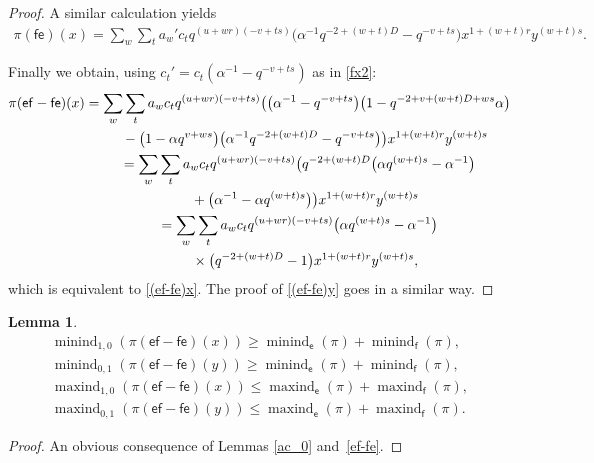 \documentclass[10pt,a4paper]{amsart}
\numberwithin{equation}{section}
\newtheorem{Lemma}[Theorem]{Lemma}
\begin{document}
\begin{proof}
A similar calculation yields
\begin{gather*}
\pi(\mathsf{fe})(x)=\sum_w\sum_ta_w'c_tq^{(u+wr)(-v+ts)} \big(\alpha^{-1}q^{-2+(w+t)D}-q^{-v+ts}\big)x^{1+(w+t)r}y^{(w+t)s}.
\end{gather*}

Finally we obtain, using $c_t'=c_t(\alpha^{-1}-q^{-v+ts})$ as in \eqref{fx2}:
\begin{gather*}
\pi(\mathsf{ef-fe})(x)=\sum_w\sum_ta_wc_tq^{(u+wr)(-v+ts)} \big(\big(\alpha^{-1}-q^{-v+ts}\big)\big(1-q^{-2+v+(w+t)D+ws}\alpha\big)\\
\hphantom{\pi(\mathsf{ef-fe})(x)=}{} -\big(1-\alpha q^{v+ws}\big)\big(\alpha^{-1}q^{-2+(w+t)D}-q^{-v+ts}\big)\big)x^{1+(w+t)r}y^{(w+t)s}\\
\hphantom{\pi(\mathsf{ef-fe})(x)}{}=\sum_w\sum_ta_wc_tq^{(u+wr)(-v+ts)} \big(q^{-2+(w+t)D}\big(\alpha q^{(w+t)s}-\alpha^{-1}\big)\\
\hphantom{\pi(\mathsf{ef-fe})(x)=}{} +\big(\alpha^{-1}-\alpha q^{(w+t)s}\big)\big)x^{1+(w+t)r}y^{(w+t)s}\\
\hphantom{\pi(\mathsf{ef-fe})(x)}{} =\sum_w\sum_ta_wc_tq^{(u+wr)(-v+ts)}\big(\alpha q^{(w+t)s}-\alpha^{-1}\big)\\
\hphantom{\pi(\mathsf{ef-fe})(x)=}{} \times \big(q^{-2+(w+t)D}-1\big)x^{1+(w+t)r}y^{(w+t)s},
\end{gather*}
which is equivalent to \eqref{(ef-fe)x}. The proof of \eqref{(ef-fe)y} goes in a similar way.
\end{proof}

\begin{Lemma}\label{extr_(ef-fe)}
\begin{gather*}
\operatorname{minind}_{1,0}(\pi(\mathsf{ef}-\mathsf{fe})(x)) \ge\operatorname{minind}_\mathsf{e}(\pi)+\operatorname{minind}_\mathsf{f}(\pi),\\
\operatorname{minind}_{0,1}(\pi(\mathsf{ef}-\mathsf{fe})(y)) \ge\operatorname{minind}_\mathsf{e}(\pi)+\operatorname{minind}_\mathsf{f}(\pi),\\
\operatorname{maxind}_{1,0}(\pi(\mathsf{ef}-\mathsf{fe})(x)) \le\operatorname{maxind}_\mathsf{e}(\pi)+\operatorname{maxind}_\mathsf{f}(\pi),\\
\operatorname{maxind}_{0,1}(\pi(\mathsf{ef}-\mathsf{fe})(y)) \le\operatorname{maxind}_\mathsf{e}(\pi)+\operatorname{maxind}_\mathsf{f}(\pi).
\end{gather*}
\end{Lemma}

\begin{proof} An obvious consequence of Lemmas \ref{ac_0} and~\ref{ef-fe}.
\end{proof}
\end{document}
